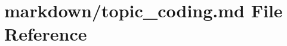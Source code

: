 \hypertarget{topic__coding_8md}{}\section{markdown/topic\+\_\+coding.md File Reference}
\label{topic__coding_8md}
